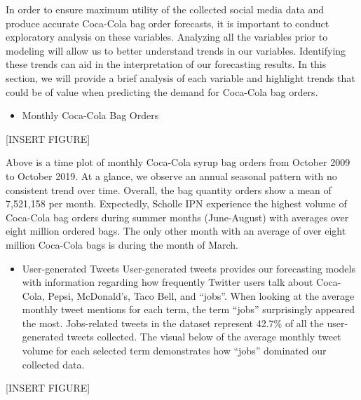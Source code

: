 \documentclass[12pt,oneside]{chicagocapstone}
\providecommand{\tightlist}{%
  \setlength{\itemsep}{0pt}\setlength{\parskip}{0pt}}
\begin{document}
In order to ensure maximum utility of the collected social media data and produce accurate Coca-Cola bag order forecasts, it is important to conduct exploratory analysis on these variables. Analyzing all the variables prior to modeling will allow us to better understand trends in our variables. Identifying these trends can aid in the interpretation of our forecasting results. In this section, we will provide a brief analysis of each variable and highlight trends that could be of value when predicting the demand for Coca-Cola bag orders.
\begin{itemize}
\tightlist
\item
  Monthly Coca-Cola Bag Orders
\end{itemize}
{[}INSERT FIGURE{]}

Above is a time plot of monthly Coca-Cola syrup bag orders from October 2009 to October 2019. At a glance, we observe an annual seasonal pattern with no consistent trend over time. Overall, the bag quantity orders show a mean of 7,521,158 per month. Expectedly, Scholle IPN experience the highest volume of Coca-Cola bag orders during summer months (June-August) with averages over eight million ordered bags. The only other month with an average of over eight million Coca-Cola bags is during the month of March.
\begin{itemize}
\tightlist
\item
  User-generated Tweets
  User-generated tweets provides our forecasting models with information regarding how frequently Twitter users talk about Coca-Cola, Pepsi, McDonald's, Taco Bell, and ``jobs''. When looking at the average monthly tweet mentions for each term, the term ``jobs'' surprisingly appeared the most. Jobs-related tweets in the dataset represent 42.7\% of all the user-generated tweets collected. The visual below of the average monthly tweet volume for each selected term demonstrates how ``jobs'' dominated our collected data.
\end{itemize}
{[}INSERT FIGURE{]}
\end{document}
